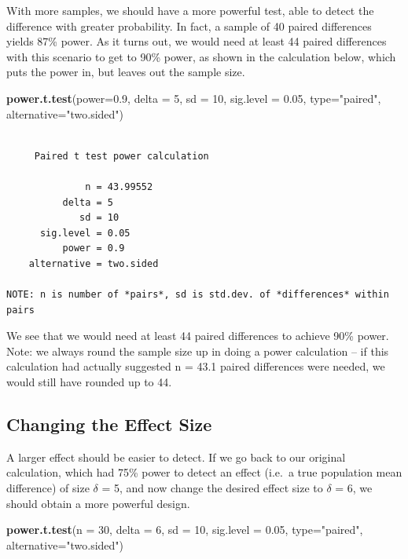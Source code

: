 \documentclass[
]{book}
\newenvironment{Shaded}{\begin{snugshade}}{\end{snugshade}}
\newcommand{\DataTypeTok}[1]{\textcolor[rgb]{0.13,0.29,0.53}{#1}}
\newcommand{\DecValTok}[1]{\textcolor[rgb]{0.00,0.00,0.81}{#1}}
\newcommand{\FloatTok}[1]{\textcolor[rgb]{0.00,0.00,0.81}{#1}}
\newcommand{\KeywordTok}[1]{\textcolor[rgb]{0.13,0.29,0.53}{\textbf{#1}}}
\newcommand{\NormalTok}[1]{#1}
\newcommand{\StringTok}[1]{\textcolor[rgb]{0.31,0.60,0.02}{#1}}
\begin{document}
With more samples, we should have a more powerful test, able to detect the difference with greater probability. In fact, a sample of 40 paired differences yields 87\% power. As it turns out, we would need at least 44 paired differences with this scenario to get to 90\% power, as shown in the calculation below, which puts the power in, but leaves out the sample size.

\begin{Shaded}
\begin{Highlighting}[]
\KeywordTok{power.t.test}\NormalTok{(}\DataTypeTok{power=}\FloatTok{0.9}\NormalTok{, }\DataTypeTok{delta =} \DecValTok{5}\NormalTok{, }\DataTypeTok{sd =} \DecValTok{10}\NormalTok{, }\DataTypeTok{sig.level =} \FloatTok{0.05}\NormalTok{, }
             \DataTypeTok{type=}\StringTok{"paired"}\NormalTok{, }\DataTypeTok{alternative=}\StringTok{"two.sided"}\NormalTok{)}
\end{Highlighting}
\end{Shaded}

\begin{verbatim}

     Paired t test power calculation 

              n = 43.99552
          delta = 5
             sd = 10
      sig.level = 0.05
          power = 0.9
    alternative = two.sided

NOTE: n is number of *pairs*, sd is std.dev. of *differences* within pairs
\end{verbatim}

We see that we would need at least 44 paired differences to achieve 90\% power. Note: we always round the sample size up in doing a power calculation -- if this calculation had actually suggested n = 43.1 paired differences were needed, we would still have rounded up to 44.

\hypertarget{changing-the-effect-size}{%
\subsection{Changing the Effect Size}\label{changing-the-effect-size}}

A larger effect should be easier to detect. If we go back to our original calculation, which had 75\% power to detect an effect (i.e.~a true population mean difference) of size \(\delta\) = 5, and now change the desired effect size to \(\delta\) = 6, we should obtain a more powerful design.

\begin{Shaded}
\begin{Highlighting}[]
\KeywordTok{power.t.test}\NormalTok{(}\DataTypeTok{n =} \DecValTok{30}\NormalTok{, }\DataTypeTok{delta =} \DecValTok{6}\NormalTok{, }\DataTypeTok{sd =} \DecValTok{10}\NormalTok{, }\DataTypeTok{sig.level =} \FloatTok{0.05}\NormalTok{, }
             \DataTypeTok{type=}\StringTok{"paired"}\NormalTok{, }\DataTypeTok{alternative=}\StringTok{"two.sided"}\NormalTok{)}
\end{Highlighting}
\end{Shaded}
\end{document}
